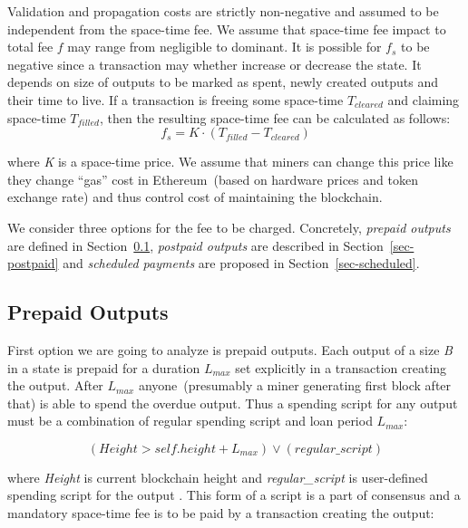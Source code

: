 \documentclass[]{llncs}   %
\newcommand{\authnote}[2]{\marginpar{\parbox{\marginparwidth}{\tiny %
  \textsf{#1 {\textcolor{blue}{notes: #2}}}}}%
  \textcolor{blue}{\textbf{\dag}}}
\newcommand{\authnote}[2]{
  \textsf{#1 \textcolor{blue}{: #2}}}
\newcommand{\authnote}[2]{}
\newcommand{\dnote}[1]{{\authnote{\textcolor{blue}{Dima notes}}{#1}}}
\begin{document}
Validation and propagation costs are strictly non-negative and assumed to be independent from the space-time fee. We assume that space-time fee impact to total fee $f$ may range from negligible to dominant. It is possible for $f_s$ to be negative since a transaction may whether increase or decrease the state. It depends on size of outputs to be marked as spent, newly created outputs and their time to live. If a transaction is freeing some space-time \textit{$T_{cleared}$} and claiming space-time \textit{$T_{filled}$}, then the  resulting space-time fee can be calculated as follows:
\begin{equation}
f_s = K \cdot (T_{filled} - T_{cleared})
\end{equation}

where \textit{K} is a space-time price. We assume that miners can change this price like they change ``gas'' cost in Ethereum~(based on hardware prices and token exchange rate) and thus control cost of maintaining the blockchain.

We consider three options for the fee to be charged. Concretely, \textit{prepaid outputs} are defined in Section~\ref{sec-prepaid}, \textit{postpaid outputs} are described in Section~\ref{sec-postpaid} and \textit{scheduled payments} are proposed in Section~\ref{sec-scheduled}.

\subsection{Prepaid Outputs}
\label{sec-prepaid}

First option we are going to analyze is prepaid outputs. Each output of a size \textit{B} in a state is prepaid for a duration $L_{max}$ set explicitly in a transaction creating the output. After $L_{max}$ anyone~(presumably a miner generating first block after that) is able to spend the overdue output. Thus a spending script for any output must be a combination of regular spending script and loan period $L_{max}$:

\begin{equation}
(Height > self.height + L_{max}) \lor (regular\_script)
\end{equation}

where \textit{Height} is current blockchain height and \textit{regular\_script} is user-defined spending script for the output\dnote{What is self.height?}. This form of a script is a part of consensus and a mandatory space-time fee is to be paid by a transaction creating the output:
\end{document}
